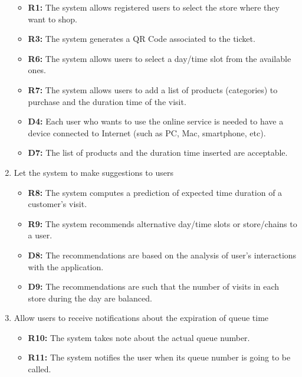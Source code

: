 \documentclass[table, 12pt]{article}
\begin{document}
\begin{enumerate}[label=\textbf{-G\arabic*}:]
{\begin{itemize}
              \item \textbf{R1:} The system allows registered users to select the store where they want to shop.
              \item \textbf{R3:} The system generates a QR Code associated to the ticket.
              \item \textbf{R6:} The system allows users to select a day/time slot from the available ones.
              \item \textbf{R7:} The system allows users to add a list of products (categories) to purchase and the duration time of the visit.
              \item \textbf{D4:} Each user who wants to use the online service is needed to have a device connected to Internet (such as PC, Mac, smartphone, etc).
              \item \textbf{D7:} The list of products and the duration time inserted are acceptable.
          \end{itemize}
          }
    \item {Let the system to make suggestions to users
          \begin{itemize}
              \item \textbf{R8:} The system computes a prediction of expected time duration of a customer's visit.
              \item \textbf{R9:} The system recommends alternative day/time slots or store/chains to a user.
              \item \textbf{D8:} The recommendations are based on the analysis of user's interactions with the application.
              \item \textbf{D9:} The recommendations are such that the number of visits in each store during the day are balanced.
          \end{itemize}
          }
    \item {Allow users to receive notifications about the expiration of queue time
          \begin{itemize}
              \item \textbf{R10:} The system takes note about the actual queue number.
              \item \textbf{R11:} The system notifies the user when its queue number is going to be called.
          \end{itemize}
          }
\end{enumerate}
\end{document}
